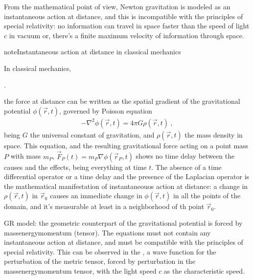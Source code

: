 \documentclass[letterpaper,10pt,english]{jupyterBook}
\begin{document}
\sphinxAtStartPar
{} From the mathematical point of view, Newton gravitation is modeled as an instantaneous action at distance, and this is incompatible with the principles of special relativity: no information can travel in space faster than the speed of light \(c\) in vacuum \sphinxhyphen{} or, there’s a finite maximum velocity of information through space.

\begin{sphinxadmonition}{note}{Instantaneous action at distance in classical mechanics}

\sphinxAtStartPar
In classical mechanics,%
\begin{footnote}[1]\sphinxAtStartFootnote
{}.
%
\end{footnote} the force at distance can be written as the spatial gradient of the gravitational potential \(\phi(\vec{r}, t)\), governed by Poisson equation
\begin{equation*}
\begin{split}-\nabla^2 \phi(\vec{r},t) = 4 \pi G \rho( \vec{r}, t) \ ,\end{split}
\end{equation*}
\sphinxAtStartPar
being \(G\) the universal constant of gravitation, and \(\rho( \vec{r}, t)\) the mass density in space. This equation, and the resulting gravitational force acting on a point mass \(P\) with mass \(m_P\), \(\vec{F}_P(t) = m_P \nabla \phi( \vec{r}_P, t)\) shows no time delay between the causes and the effects, being everything at time \(t\). The absence of a time differential operator or a time delay \sphinxhyphen{} and the presence of the Laplacian operator \sphinxhyphen{} is the mathematical manifestation of instantaneouos action at distance: a change in \(\rho(\vec{r},t)\) in \(\vec{r}_0\) causes an immediate change in \(\phi(\vec{r},t)\) in all the points of the domain, and it’s measurable at least in a neighborhood of th point \(\vec{r}_0\).

\sphinxAtStartPar
GR model: the geometric counterpart of the gravitational potential is forced by  mass\sphinxhyphen{}energy\sphinxhyphen{}momentum (tensor). The equations must not contain any instantaneous action at distance, and must be compatible with the principles of special relativity. This can be observed in the {\hyperref[\detokenize{ch/relativity-general/linearized-efe:relativity-general-notes-einstein-equation-linearization}]{}}, a wave function for the perturbation of the metric tensor, forced by perturbation in the mass\sphinxhyphen{}energy\sphinxhyphen{}momentum tensor, with the light speed \(c\) as the characteristic speed.
\end{sphinxadmonition}
\end{document}
